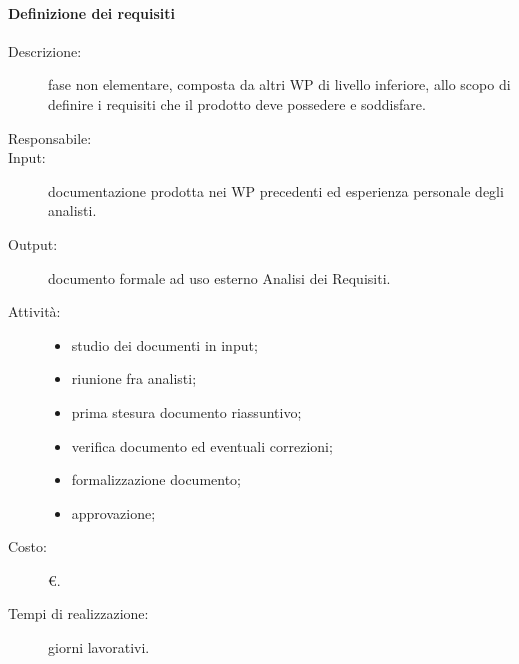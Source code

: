 \paragraph{Definizione dei requisiti}
\begin{description}
\item[Descrizione:] fase non elementare, composta da altri WP di livello inferiore, allo scopo di definire i requisiti che il prodotto deve possedere e soddisfare.
\item[Responsabile:] 
\item[Input:] documentazione prodotta nei WP precedenti ed esperienza personale degli analisti.
\item[Output:] documento formale ad uso esterno Analisi dei Requisiti.
\item[Attività:]
\begin{itemize}
\item studio dei documenti in input;
\item riunione fra analisti;
\item prima stesura documento riassuntivo;
\item verifica documento ed eventuali correzioni;
\item formalizzazione documento;
\item approvazione;
\end{itemize}
\item[Costo:] \euro{}.
\item[Tempi di realizzazione:]  giorni lavorativi.
\end{description}

